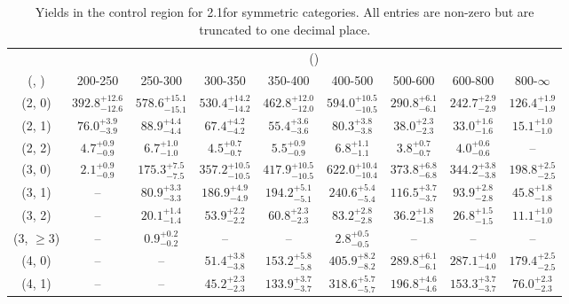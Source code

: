 \begin{table}[h!]
\tiny
\centering
\caption{Yields in the \mj control region for 2.1\ifb for symmetric categories. All entries are non-zero but are truncated to one decimal place.\label{tab:yieldssep_mu_ewk_sym}}
\begin{tabular}
{ccccccccc}
	\hline\hline
	& \multicolumn{8}{c}{\scalht (\gev)} \\ 
	 (\njet,  \nb) & 200-250 & 250-300 & 300-350 & 350-400 & 400-500 & 500-600 & 600-800 & 800-$\infty$ \\ [0.8ex] 
\hline
	(2, 0) & $392.8^{+ 12.6 }_{- 12.6 }$ & $578.6^{+ 15.1 }_{- 15.1 }$ & $530.4^{+ 14.2 }_{- 14.2 }$ & $462.8^{+ 12.0 }_{- 12.0 }$ & $594.0^{+ 10.5 }_{- 10.5 }$ & $290.8^{+ 6.1 }_{- 6.1 }$ & $242.7^{+ 2.9 }_{- 2.9 }$ & $126.4^{+ 1.9 }_{- 1.9 }$ \\[0.5ex] 
	(2, 1) & $76.0^{+ 3.9 }_{- 3.9 }$ & $88.9^{+ 4.4 }_{- 4.4 }$ & $67.4^{+ 4.2 }_{- 4.2 }$ & $55.4^{+ 3.6 }_{- 3.6 }$ & $80.3^{+ 3.8 }_{- 3.8 }$ & $38.0^{+ 2.3 }_{- 2.3 }$ & $33.0^{+ 1.6 }_{- 1.6 }$ & $15.1^{+ 1.0 }_{- 1.0 }$ \\[0.5ex] 
	(2, 2) & $4.7^{+ 0.9 }_{- 0.9 }$ & $6.7^{+ 1.0 }_{- 1.0 }$ & $4.5^{+ 0.7 }_{- 0.7 }$ & $5.5^{+ 0.9 }_{- 0.9 }$ & $6.8^{+ 1.1 }_{- 1.1 }$ & $3.8^{+ 0.7 }_{- 0.7 }$ & $4.0^{+ 0.6 }_{- 0.6 }$ & -- \\[0.5ex] 
	(3, 0) & $2.1^{+ 0.9 }_{- 0.9 }$ & $175.3^{+ 7.5 }_{- 7.5 }$ & $357.2^{+ 10.5 }_{- 10.5 }$ & $417.9^{+ 10.5 }_{- 10.5 }$ & $622.0^{+ 10.4 }_{- 10.4 }$ & $373.8^{+ 6.8 }_{- 6.8 }$ & $344.2^{+ 3.8 }_{- 3.8 }$ & $198.8^{+ 2.5 }_{- 2.5 }$ \\[0.5ex] 
	(3, 1) & -- & $80.9^{+ 3.3 }_{- 3.3 }$ & $186.9^{+ 4.9 }_{- 4.9 }$ & $194.2^{+ 5.1 }_{- 5.1 }$ & $240.6^{+ 5.4 }_{- 5.4 }$ & $116.5^{+ 3.7 }_{- 3.7 }$ & $93.9^{+ 2.8 }_{- 2.8 }$ & $45.8^{+ 1.8 }_{- 1.8 }$ \\[0.5ex] 
	(3, 2) & -- & $20.1^{+ 1.4 }_{- 1.4 }$ & $53.9^{+ 2.2 }_{- 2.2 }$ & $60.8^{+ 2.3 }_{- 2.3 }$ & $83.2^{+ 2.8 }_{- 2.8 }$ & $36.2^{+ 1.8 }_{- 1.8 }$ & $26.8^{+ 1.5 }_{- 1.5 }$ & $11.1^{+ 1.0 }_{- 1.0 }$ \\[0.5ex] 
	(3, $\ge3$) & -- & $0.9^{+ 0.2 }_{- 0.2 }$ & -- & -- & $2.8^{+ 0.5 }_{- 0.5 }$ & -- & -- & -- \\[0.5ex] 
	(4, 0) & -- & -- & $51.4^{+ 3.8 }_{- 3.8 }$ & $153.2^{+ 5.8 }_{- 5.8 }$ & $405.9^{+ 8.2 }_{- 8.2 }$ & $289.8^{+ 6.1 }_{- 6.1 }$ & $287.1^{+ 4.0 }_{- 4.0 }$ & $179.4^{+ 2.5 }_{- 2.5 }$ \\[0.5ex] 
	(4, 1) & -- & -- & $45.2^{+ 2.3 }_{- 2.3 }$ & $133.9^{+ 3.7 }_{- 3.7 }$ & $318.6^{+ 5.7 }_{- 5.7 }$ & $196.8^{+ 4.6 }_{- 4.6 }$ & $153.3^{+ 3.7 }_{- 3.7 }$ & $76.0^{+ 2.3 }_{- 2.3 }$ \\[0.5ex] 

\end{tabular}
\end{table}
